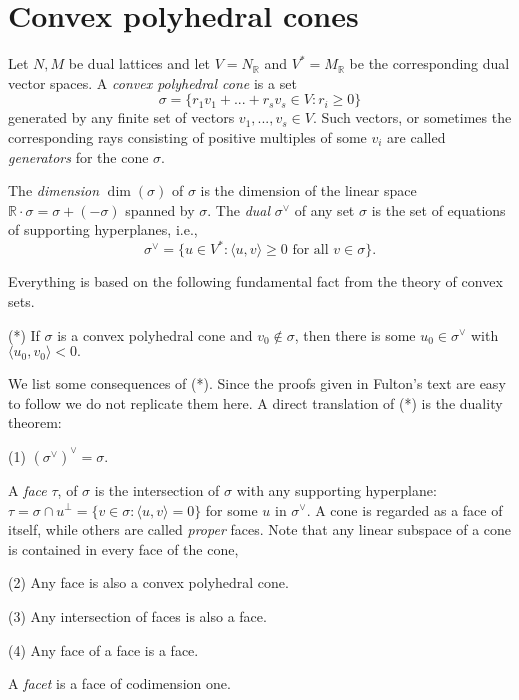 \documentclass[10pt,a4paper]{book}
\newcommand{\jarek}[1]{\todo[color=green!40]{JB: #1}}             %
\newcommand{\on}{\operatorname}
\begin{document}
\section{Convex polyhedral cones}\label{sec:convex_polyhedral_cones}
Let $N,M$ be dual lattices and let $V=N_\mathbb{R}$ and $V^*=M_\mathbb{R}$ be the corresponding dual vector spaces. A \textit{convex polyhedral cone} is a set 
\[
\sigma = \{r_1v_1+...+r_sv_s\in V: r_i\geq 0\}
\]
generated by any finite set of vectors $v_1,..., v_s \in V$. Such vectors, or sometimes the corresponding rays consisting of positive multiples of some $v_i$ are called \textit{generators} for the cone $\sigma$.


The \textit{dimension} $\on{dim}(\sigma)$ of $\sigma$ is the dimension of the linear space $\mathbb{R}\cdot \sigma = \sigma  + (-\sigma)$ spanned by $\sigma$. The \textit{dual} $\sigma^\vee$ of any set $\sigma$ is the set of equations of supporting hyperplanes, i.e.,
\[
\sigma^\vee = \{u\in V^*: \langle u,v \rangle \geq 0 \text{ for all }v\in \sigma\}.
\]

Everything is based on the following fundamental fact from the theory of convex sets.

\smallskip
\noindent (*) If  $\sigma$ is a convex polyhedral cone and  $v_0\notin \sigma$, then there is some  $u_0 \in \sigma^\vee$ with $\langle u_0, v_0 \rangle < 0.$
\smallskip

We list some consequences of (*). Since the proofs given in Fulton's text are easy to follow we do not replicate them here.
A direct translation of (*) is the duality theorem:

\smallskip
\noindent (1) $(\sigma^\vee)^\vee = \sigma.$
\smallskip

A \textit{face} $\tau$, of $\sigma$ is the intersection of $\sigma$ with any supporting hyperplane: $\tau= \sigma\cap u^\perp =\{v\in \sigma :\langle u, v \rangle = 0\}$ for some $u$ in $\sigma^\vee$. A cone is regarded as a face of itself, while others are called \textit{proper} faces. Note that any linear subspace of a cone is contained in every face of the cone,

\smallskip
\noindent (2) Any face is also a convex polyhedral cone. 
\smallskip

\smallskip
\noindent (3) Any intersection of faces is also a face.
\smallskip

\smallskip
\noindent (4) Any face of a face is a face.
\smallskip

A \textit{facet} is a face of codimension one.
\end{document}
